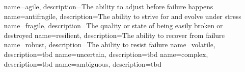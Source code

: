 
{
	name=agile,
	description={The ability to adjust before failure happens}
}
{
	name=antifragile,
	description={The ability to strive for and evolve under stress}
}
{
	name=fragile,
	description={The quality or state of being easily broken or destroyed}
}
{
	name=resilient,
	description={The ability to recover from failure}
}
{
	name=robust,
	description={The ability to resist failure}
}
{
	name=volatile,
	description={tbd}
}
{
	name=uncertain,
	description={tbd}
}
{
	name=complex,
	description={tbd}
}
{
	name=ambiguous,
	description={tbd}
}